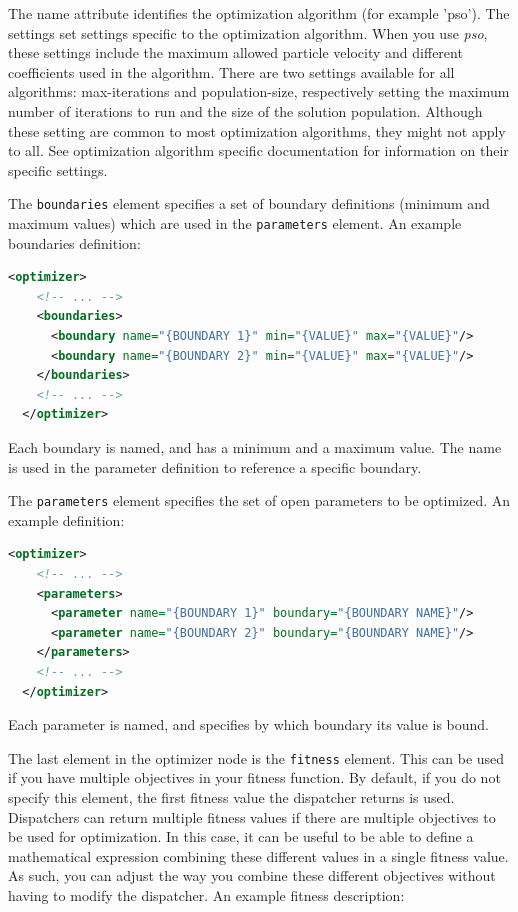 \documentclass{article}
\begin{document}
The name attribute identifies the optimization algorithm (for example 'pso').
The settings set settings specific to the optimization algorithm. When you use
\textit{pso}, these settings include the maximum allowed particle velocity
and different coefficients used in the algorithm. There are two settings
available for all algorithms: max-iterations and population-size, respectively
setting the maximum number of iterations to run and the size of the solution
population. Although these setting are common to most optimization algorithms,
they might not apply to all. See optimization algorithm specific documentation
for information on their specific settings.

The \verb!boundaries! element specifies a set of boundary definitions (minimum
and maximum values) which are used in the \verb!parameters! element. An example
boundaries definition:

\begin{lstlisting}[language=xml]
  <optimizer>
    <!-- ... -->
    <boundaries>
      <boundary name="{BOUNDARY 1}" min="{VALUE}" max="{VALUE}"/>
      <boundary name="{BOUNDARY 2}" min="{VALUE}" max="{VALUE}"/>
    </boundaries>
    <!-- ... -->
  </optimizer>
\end{lstlisting}

Each boundary is named, and has a minimum and a maximum value. The name is
used in the parameter definition to reference a specific boundary.

The \verb!parameters! element specifies the set of open parameters to be
optimized. An example definition:

\begin{lstlisting}[language=xml]
  <optimizer>
    <!-- ... -->
    <parameters>
      <parameter name="{BOUNDARY 1}" boundary="{BOUNDARY NAME}"/>
      <parameter name="{BOUNDARY 2}" boundary="{BOUNDARY NAME}"/>
    </parameters>
    <!-- ... -->
  </optimizer>
\end{lstlisting}

Each parameter is named, and specifies by which boundary its value is bound.

The last element in the optimizer node is the \verb!fitness! element. 
This can be used if you have
multiple objectives in your fitness function. By default, if you do not specify
this element, the first fitness value the dispatcher returns is used.
Dispatchers can return multiple fitness values if there are multiple objectives
to be used for optimization. In this case, it can be useful to be able to 
define a mathematical expression combining these different values in a single
fitness value. As such, you can adjust the way you combine these different
objectives without having to modify the dispatcher. An example fitness
description:
\end{document}
